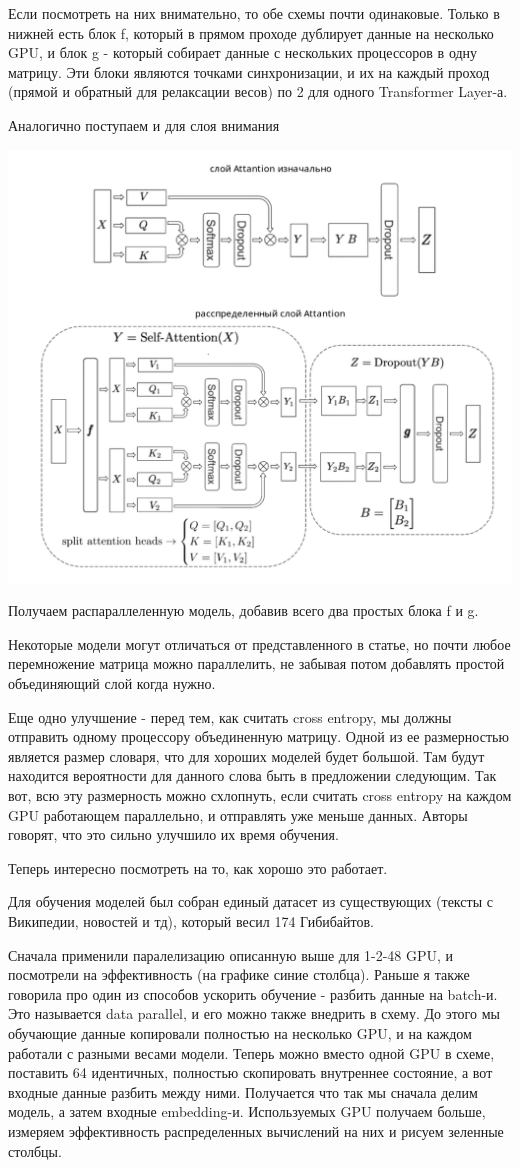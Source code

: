 Если посмотреть на них внимательно, то обе схемы почти одинаковые. Только в нижней есть блок f, который в прямом проходе дублирует данные на несколько GPU, и блок g - который собирает данные с нескольких процессоров в одну матрицу. Эти блоки являются точками синхронизации, и их на каждый проход (прямой и обратный для релаксации весов) по 2 для одного Transformer Layer-а. 


Аналогично поступаем и для слоя внимания

\includegraphics[width=0.6\linewidth]{Parts/images/TP_Attention.png}

Получаем распараллеленную модель, добавив всего два простых блока f и g.


Некоторые модели могут отличаться от представленного в статье, но почти любое перемножение матрица можно параллелить, не забывая потом добавлять простой объединяющий слой когда нужно. 

Еще одно  улучшение - перед тем, как считать cross entropy, мы должны отправить одному процессору объединенную матрицу. Одной из ее размерностью является размер словаря, что для хороших моделей будет большой. Там будут находится вероятности для данного слова быть в предложении следующим. Так вот, всю эту размерность можно схлопнуть, если считать  cross entropy на каждом GPU работающем параллельно, и отправлять уже меньше данных. Авторы говорят, что это сильно улучшило их время обучения. 

Теперь интересно посмотреть на то, как хорошо это работает.

Для обучения моделей был собран единый датасет из существующих (тексты с Википедии, новостей и тд), который весил 174 Гибибайтов. 

Сначала применили паралелизацию описанную выше для 1-2-48 GPU, и посмотрели на эффективность (на графике синие столбца). Раньше я также говорила про один из способов ускорить обучение - разбить данные на batch-и. Это называется data parallel, и его можно также внедрить в схему. До этого мы обучающие данные копировали полностью на несколько GPU, и на каждом работали с разными весами модели. Теперь можно вместо одной GPU в схеме, поставить 64 идентичных, полностью скопировать внутреннее состояние, а вот входные данные разбить между ними. Получается что так мы сначала делим модель, а затем входные embedding-и. Используемых GPU получаем больше, измеряем эффективность распределенных вычислений на них и рисуем зеленные столбцы.

